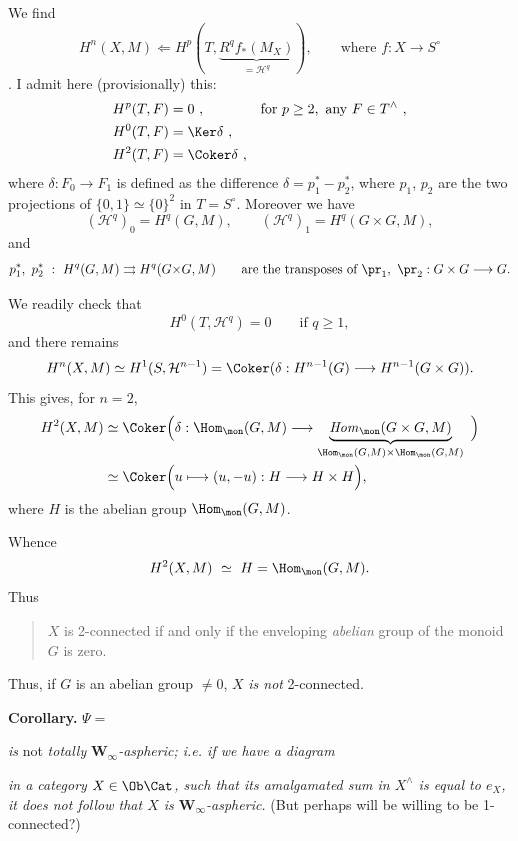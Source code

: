 We find 
\[
H^n(X,M) \Longleftarrow H^p(T, \underbrace{R^q f_*(M_X)}_{= \mathcal{H}^q}), \qquad \text{where } f : X \longrightarrow S^\circ
\]
. I admit here (provisionally) this: %
\[
\begin{aligned}
H^p(T,F) &= 0 \ , &&\text{for } p\geq 2, \text{ any } F\in T^\wedge \ ,\\
H^0(T,F) &= \Ker\delta \ , &&\\
H^2(T,F) &= \Coker\delta \ , && %
\end{aligned}
\]
where $\delta : F_0 \longrightarrow F_1$ is defined as the difference $\delta = p_1^* - p_2^*$, where $p_1$, $p_2$ are the two projections of $\{0,1\}\simeq\{0\}^2$ in $T = S^\circ$. Moreover we have
\[
(\mathcal{H}^q)_0 = H^q(G,M), \qquad (\mathcal{H}^q)_1 = H^q(G\times G, M),
\]
and
\[
p_1^*,\ p_2^*\ :\ H^q(G,M) \rightrightarrows H^q(G{\times}G, M) \qquad \text{are the transposes of } \pr_1,\ \pr_2 : G\times G\longrightarrow G.
\]

We readily check that
\[
H^0(T,\mathcal{H}^q) = 0 \qquad \text{if } q\geq 1,
\]
and there remains
\[
H^n(X,M) \simeq H^1(S,\mathcal{H}^{n-1}) = \Coker(\delta : H^{n-1}(G) \longrightarrow H^{n-1}(G\times G)). %
\]
This gives, for $n = 2$,
\[
\begin{aligned}
H^2(X,M) &\simeq \Coker\Big(\delta : \Hom_\mon(G,M) \longrightarrow \underbrace{\mathit{Hom}_\mon(G\times G, M)}_{\Hom_\mon(G,M)\times\Hom_\mon(G,M)} \ \Big)\\
&\simeq \Coker\Big(u\longmapsto (u,-u) : H \longrightarrow H\times H\Big),
\end{aligned}
\]
where $H$ is the abelian group $\Hom_\mon(G,M)$.

Whence
\[
H^2(X,M) \ \simeq\ H = \Hom_\mon(G,M).
\]
Thus
\begin{quote}
$X$ is 2-connected if and only if the enveloping \textit{abelian} group of the monoid $G$ is zero.
\end{quote}

Thus, if $G$ is an abelian group $\neq 0$, $X$ \textit{is not} 2-connected.

\textbf{Corollary.} $\Psi = {}$
\textit{is} not \textit{totally} $\mathbf{W}_\infty$\textit{-aspheric; i.e. if we have a diagram} 
\textit{in a category} $X\in\Ob\Cat$\textit{, such that its amalgamated sum in $X^\wedge$ is equal to $e_X$, it does not follow that $X$ is $\mathbf{W}_\infty$-aspheric.} (But perhaps will be willing to be 1-connected?)

